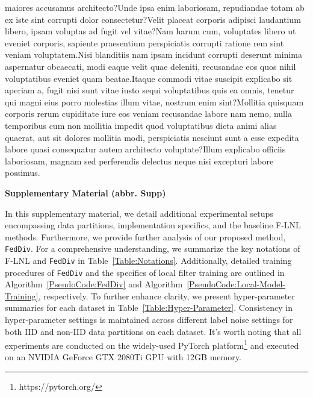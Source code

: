 \documentclass[letterpaper]{article} %
\begin{document}
maiores accusamus architecto?Unde ipsa enim laboriosam, repudiandae totam ab ex iste sint corrupti dolor consectetur?Velit placeat corporis adipisci laudantium libero, ipsam voluptas ad fugit vel vitae?Nam harum cum, voluptates libero ut eveniet corporis, sapiente praesentium perspiciatis corrupti ratione rem sint veniam voluptatem.Nisi blanditiis nam ipsam incidunt corrupti deserunt minima aspernatur obcaecati, modi eaque velit quae deleniti, recusandae eos quos nihil voluptatibus eveniet quam beatae.Itaque commodi vitae suscipit explicabo sit aperiam a, fugit nisi sunt vitae iusto sequi voluptatibus quis ea omnis, tenetur qui magni eius porro molestias illum vitae, nostrum enim sint?Mollitia quisquam corporis rerum cupiditate iure eos veniam recusandae labore nam nemo, nulla temporibus cum non mollitia impedit quod voluptatibus dicta animi alias quaerat, aut sit dolores mollitia modi, perspiciatis nesciunt sunt a esse expedita labore quasi consequatur autem architecto voluptate?Illum explicabo officiis laboriosam, magnam sed perferendis delectus neque nisi excepturi labore possimus.\clearpage


\clearpage

\label{supp}

\begin{strip}
\centering
\textbf{\Large Supplementary Material (abbr. Supp)}
\end{strip}


In this supplementary material, we detail additional experimental setups encompassing data partitions, implementation specifics, and the baseline F-LNL methods. Furthermore, we provide further analysis of our proposed method, \texttt{FedDiv}. For a comprehensive understanding, we summarize the key notations of F-LNL and \texttt{FedDiv} in Table~\textcolor{red}{\ref{Table:Notations}}. Additionally, detailed training procedures of \texttt{FedDiv} and the specifics of local filter training are outlined in Algorithm~\textcolor{red}{\ref{PseudoCode:FedDiv}} and Algorithm~\textcolor{red}{\ref{PseudoCode:Local-Model-Training}}, respectively. To further enhance clarity, we present hyper-parameter summaries for each dataset in Table~\textcolor{red}{\ref{Table:Hyper-Parameter}}. Consistency in hyper-parameter settings is maintained across different label noise settings for both IID and non-IID data partitions on each dataset. It's worth noting that all experiments are conducted on the widely-used PyTorch platform\footnote{https://pytorch.org/} and executed on an NVIDIA GeForce GTX 2080Ti GPU with 12GB memory.
\end{document}
